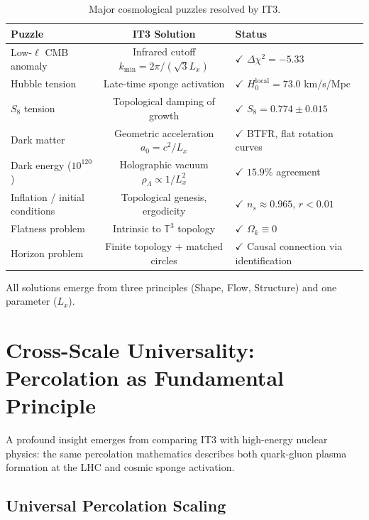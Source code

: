 \documentclass[12pt,a4paper]{article}
\begin{document}
\begin{table}[t]
\centering
\caption{Major cosmological puzzles resolved by IT3.}
\label{tab:resolved}
\begin{tabular}{@{} l c >{\raggedright\arraybackslash}p{4.5cm} @{}}
\toprule
\textbf{Puzzle} & \textbf{IT3 Solution} & \textbf{Status} \\
\midrule
Low-$\ell$ CMB anomaly & Infrared cutoff $k_{\min} = 2\pi/(\sqrt{3}L_x)$ & $\checkmark$ $\Delta\chi^2 = -5.33$ \\
Hubble tension & Late-time sponge activation & $\checkmark$ $H_0^{\mathrm{local}} = 73.0$ km/s/Mpc \\
$S_8$ tension & Topological damping of growth & $\checkmark$ $S_8 = 0.774 \pm 0.015$ \\
Dark matter & Geometric acceleration $a_0 = c^2/L_x$ & $\checkmark$ BTFR, flat rotation curves \\
Dark energy ($10^{120}$) & Holographic vacuum $\rho_\Lambda \propto 1/L_x^2$ & $\checkmark$ $15.9\%$ agreement \\
Inflation / initial conditions & Topological genesis, ergodicity & $\checkmark$ $n_s \approx 0.965$, $r < 0.01$ \\
Flatness problem & Intrinsic to $\mathbb{T}^3$ topology & $\checkmark$ $\Omega_k \equiv 0$ \\
Horizon problem & Finite topology + matched circles & $\checkmark$ Causal connection via identification \\
\bottomrule
\end{tabular}
\end{table}

All solutions emerge from three principles (Shape, Flow, Structure) and one parameter ($L_x$).

\section{Cross-Scale Universality: Percolation as Fundamental Principle}

A profound insight emerges from comparing IT3 with high-energy nuclear physics: the same percolation mathematics describes both quark-gluon plasma formation at the LHC and cosmic sponge activation.

\subsection{Universal Percolation Scaling}
\end{document}
